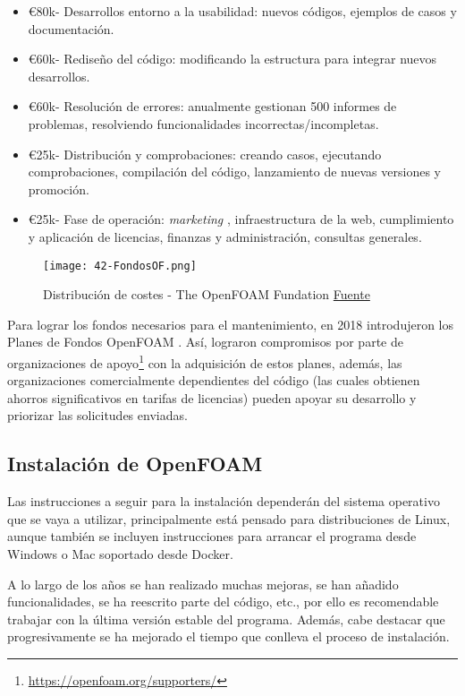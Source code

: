 \begin{itemize}
\item
  \euro{}80k- Desarrollos entorno a la usabilidad: nuevos códigos,
  ejemplos de casos y documentación.
\item
  \euro{}60k- Rediseño del código: modificando la estructura para
  integrar nuevos desarrollos.
\item
  \euro{}60k- Resolución de errores: anualmente gestionan 500 informes
  de problemas, resolviendo funcionalidades incorrectas/incompletas.
\item
  \euro{}25k- Distribución y comprobaciones: creando casos, ejecutando
  comprobaciones, compilación del código, lanzamiento de nuevas
  versiones y promoción.
\item
  \euro{}25k- Fase de operación: \emph{marketing} , infraestructura de
  la web, cumplimiento y aplicación de licencias, finanzas y
  administración, consultas generales.
\end{itemize}

\begin{figure}
\centering
\texttt{[image: 42-FondosOF.png]}
\caption[Distribución de costes]{Distribución de costes - The OpenFOAM Fundation \href{https://openfoam.org/news/funding-2018/}{Fuente}}
\label{fig:fondosof}
\end{figure}

Para lograr los fondos necesarios para el mantenimiento, en 2018
introdujeron los Planes de
Fondos OpenFOAM \cite{maitenance}. Así, lograron compromisos por parte de organizaciones de apoyo\footnote{\url{https://openfoam.org/supporters/}} con la
adquisición de estos planes, además, las organizaciones comercialmente
dependientes del código (las cuales obtienen ahorros significativos en
tarifas de licencias) pueden apoyar su desarrollo y priorizar las
solicitudes enviadas.

\subsection{Instalación de OpenFOAM}\label{header-n91}

Las instrucciones a seguir para la instalación dependerán del sistema
operativo que se vaya a utilizar, principalmente está pensado para
distribuciones de Linux, aunque también se incluyen instrucciones para
arrancar el programa desde Windows o Mac soportado desde Docker.

A lo largo de los años se han realizado muchas mejoras, se han añadido
funcionalidades, se ha reescrito parte del código, etc., por ello es
recomendable trabajar con la última versión estable del programa.
Además, cabe destacar que progresivamente se ha mejorado el tiempo que
conlleva el proceso de instalación.

